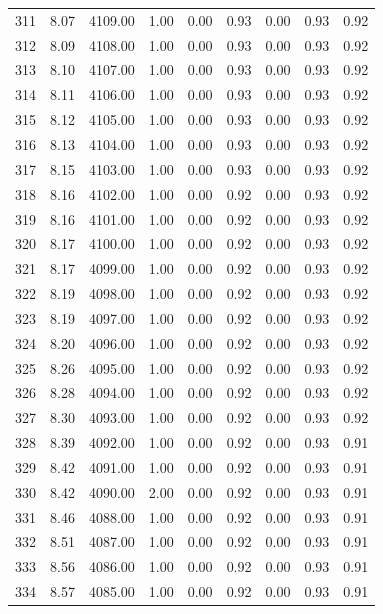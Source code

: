 \documentclass{article}\usepackage[]{graphicx}\usepackage[]{color}
\begin{document}
\begin{longtable}{rrrrrrrrr}
  311 & 8.07 & 4109.00 & 1.00 & 0.00 & 0.93 & 0.00 & 0.93 & 0.92 \\ 
  312 & 8.09 & 4108.00 & 1.00 & 0.00 & 0.93 & 0.00 & 0.93 & 0.92 \\ 
  313 & 8.10 & 4107.00 & 1.00 & 0.00 & 0.93 & 0.00 & 0.93 & 0.92 \\ 
  314 & 8.11 & 4106.00 & 1.00 & 0.00 & 0.93 & 0.00 & 0.93 & 0.92 \\ 
  315 & 8.12 & 4105.00 & 1.00 & 0.00 & 0.93 & 0.00 & 0.93 & 0.92 \\ 
  316 & 8.13 & 4104.00 & 1.00 & 0.00 & 0.93 & 0.00 & 0.93 & 0.92 \\ 
  317 & 8.15 & 4103.00 & 1.00 & 0.00 & 0.93 & 0.00 & 0.93 & 0.92 \\ 
  318 & 8.16 & 4102.00 & 1.00 & 0.00 & 0.92 & 0.00 & 0.93 & 0.92 \\ 
  319 & 8.16 & 4101.00 & 1.00 & 0.00 & 0.92 & 0.00 & 0.93 & 0.92 \\ 
  320 & 8.17 & 4100.00 & 1.00 & 0.00 & 0.92 & 0.00 & 0.93 & 0.92 \\ 
  321 & 8.17 & 4099.00 & 1.00 & 0.00 & 0.92 & 0.00 & 0.93 & 0.92 \\ 
  322 & 8.19 & 4098.00 & 1.00 & 0.00 & 0.92 & 0.00 & 0.93 & 0.92 \\ 
  323 & 8.19 & 4097.00 & 1.00 & 0.00 & 0.92 & 0.00 & 0.93 & 0.92 \\ 
  324 & 8.20 & 4096.00 & 1.00 & 0.00 & 0.92 & 0.00 & 0.93 & 0.92 \\ 
  325 & 8.26 & 4095.00 & 1.00 & 0.00 & 0.92 & 0.00 & 0.93 & 0.92 \\ 
  326 & 8.28 & 4094.00 & 1.00 & 0.00 & 0.92 & 0.00 & 0.93 & 0.92 \\ 
  327 & 8.30 & 4093.00 & 1.00 & 0.00 & 0.92 & 0.00 & 0.93 & 0.92 \\ 
  328 & 8.39 & 4092.00 & 1.00 & 0.00 & 0.92 & 0.00 & 0.93 & 0.91 \\ 
  329 & 8.42 & 4091.00 & 1.00 & 0.00 & 0.92 & 0.00 & 0.93 & 0.91 \\ 
  330 & 8.42 & 4090.00 & 2.00 & 0.00 & 0.92 & 0.00 & 0.93 & 0.91 \\ 
  331 & 8.46 & 4088.00 & 1.00 & 0.00 & 0.92 & 0.00 & 0.93 & 0.91 \\ 
  332 & 8.51 & 4087.00 & 1.00 & 0.00 & 0.92 & 0.00 & 0.93 & 0.91 \\ 
  333 & 8.56 & 4086.00 & 1.00 & 0.00 & 0.92 & 0.00 & 0.93 & 0.91 \\ 
  334 & 8.57 & 4085.00 & 1.00 & 0.00 & 0.92 & 0.00 & 0.93 & 0.91 \\ 

\end{longtable}
\end{document}
